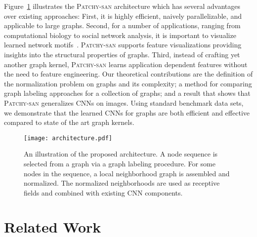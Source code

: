 \documentclass{article}
\newcommand{\patchysan}{{\textsc{Patchy-san}}\xspace}
\begin{document}
Figure~\ref{fig-architecture} illustrates the \patchysan architecture which has several advantages over existing approaches: First, it is highly efficient, naively parallelizable, and applicable to  large graphs. Second, for a number of applications, ranging from computational biology to social network analysis, it is important to visualize learned network motifs~\cite{milo:2002}. \patchysan supports feature visualizations providing insights into the structural properties of graphs. Third, instead of crafting yet another graph kernel, \patchysan learns application dependent features without the need to feature engineering. Our theoretical contributions are the definition of the normalization problem on graphs and its complexity; a method for comparing graph labeling approaches for a collection of graphs; and a result that shows that \patchysan generalizes CNNs on images.  Using standard benchmark data sets, we demonstrate that the learned CNNs for graphs are both efficient and effective compared to state of the art graph kernels. 

\begin{figure}
\centering
\texttt{[image: architecture.pdf]}
\caption{\label{fig-architecture} An illustration of the proposed architecture. A node sequence is selected from a graph via a graph labeling procedure. For some nodes in the sequence, a local neighborhood graph is assembled and normalized. The  normalized neighborhoods are used as receptive fields and combined with existing CNN components.}
\end{figure}





\section{Related Work}
\label{sec:related}
\end{document}
